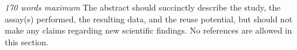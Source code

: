 \textit{170 words maximum}
The abstract should succinctly describe the study, the assay(s) performed, the resulting data, and the reuse potential, but should not make any claims regarding new scientific findings.  No references are allowed in this section. 
